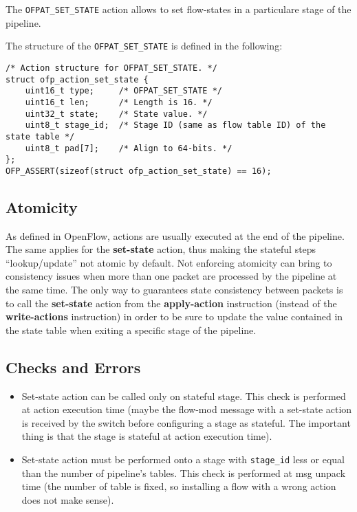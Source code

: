 The \texttt{OFPAT\_SET\_STATE} action allows to set flow-states in a particulare stage of the pipeline.

The structure of the \texttt{OFPAT\_SET\_STATE} is defined in the following:

\begin{verbatim}
/* Action structure for OFPAT_SET_STATE. */
struct ofp_action_set_state {
    uint16_t type;     /* OFPAT_SET_STATE */
    uint16_t len;      /* Length is 16. */
    uint32_t state;    /* State value. */
    uint8_t stage_id;  /* Stage ID (same as flow table ID) of the state table */
    uint8_t pad[7];    /* Align to 64-bits. */
};
OFP_ASSERT(sizeof(struct ofp_action_set_state) == 16);
\end{verbatim}


\subsection{Atomicity}
As defined in OpenFlow, actions are usually executed at the end of the pipeline. The same applies for the \textbf{set-state} action, thus making the stateful steps ``lookup/update'' not atomic by default. Not enforcing atomicity can bring to consistency issues when more than one packet are processed by the pipeline at the same time. The only way to guarantees state consistency between packets is to call the \textbf{set-state} action from the \textbf{apply-action} instruction (instead of the \textbf{write-actions} instruction) in order to be sure to update the value contained in the state table when exiting a specific stage of the pipeline.

\subsection{Checks and Errors}

\begin{itemize}
\item Set-state action can be called only on stateful stage. This check is performed at action execution time (maybe the flow-mod message with a set-state action is received by the switch before configuring a stage as stateful. The important thing is that the stage is stateful at action execution time).

\item Set-state action must be performed onto a stage with \texttt{stage\_id} less or equal than the number of pipeline’s tables. This check is performed at msg unpack time (the number of table is fixed, so installing a flow with a wrong action does not make sense).
\end{itemize}

